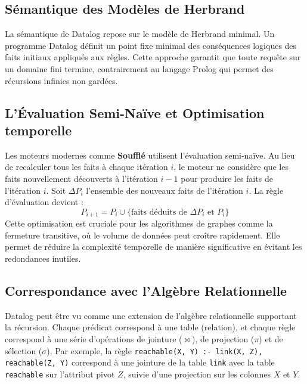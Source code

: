 \documentclass[12pt,a4paper]{report}
\begin{document}
\subsection{Sémantique des Modèles de Herbrand}
La sémantique de Datalog repose sur le modèle de Herbrand minimal. Un programme Datalog définit un point fixe minimal des conséquences logiques des faits initiaux appliqués aux règles. Cette approche garantit que toute requête sur un domaine fini termine, contrairement au langage Prolog qui permet des récursions infinies non gardées.

\subsection{L'Évaluation Semi-Naïve et Optimisation temporelle}
Les moteurs modernes comme \textbf{Soufflé} utilisent l'évaluation semi-naïve. Au lieu de recalculer tous les faits à chaque itération $i$, le moteur ne considère que les faits nouvellement découverts à l'itération $i-1$ pour produire les faits de l'itération $i$. 
Soit $\Delta P_i$ l'ensemble des nouveaux faits de l'itération $i$. La règle d'évaluation devient :
$$P_{i+1} = P_i \cup \{ \text{faits déduits de } \Delta P_i \text{ et } P_i \}$$
Cette optimisation est cruciale pour les algorithmes de graphes comme la fermeture transitive, où le volume de données peut croître rapidement. Elle permet de réduire la complexité temporelle de manière significative en évitant les redondances inutiles.

\subsection{Correspondance avec l'Algèbre Relationnelle}
Datalog peut être vu comme une extension de l'algèbre relationnelle supportant la récursion. Chaque prédicat correspond à une table (relation), et chaque règle correspond à une série d'opérations de jointure ($\bowtie$), de projection ($\pi$) et de sélection ($\sigma$).
Par exemple, la règle \texttt{reachable(X, Y) :- link(X, Z), reachable(Z, Y)} correspond à une jointure de la table \texttt{link} avec la table \texttt{reachable} sur l'attribut pivot $Z$, suivie d'une projection sur les colonnes $X$ et $Y$.
\end{document}
